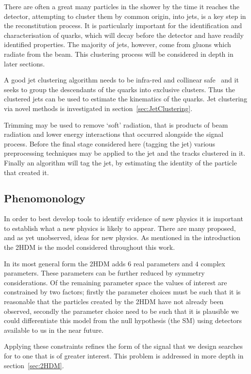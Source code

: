 There are often a great many particles in the shower by the time it reaches the detector,
attempting to cluster them by common origin,
into jets, is a key step in the reconstitution process.
It is particularly important for the identification and characterisation of quarks,
which will decay before the detector and have readily identified properties.
The majority of jets, however, come from gluons which radiate from the beam.
This clustering process will be considered in depth in later sections.

A good jet clustering algorithm needs to be infra-red and collinear safe~\cite[p.~10]{Salam2010TowardsJetography}
and it seeks to group the descendants of the quarks into exclusive clusters.
Thus the clustered jets can be used to estimate the kinematics of the quarks.
Jet clustering via novel methods is investigated in section~\ref{sec:JetClustering}.

Trimming may be used to remove `soft' radiation, that is products of beam radiation and lower energy interactions that occurred alongside the signal process.
Before the final stage considered here (tagging the jet) various preprocessing techniques may be applied to the jet and the tracks clustered in it.
Finally an algorithm will tag the jet, by estimating the identity of the particle that created it.

\subsection{Phenomonology}
In order to best develop tools to identify evidence of new physics it is important to establish what
a new physics is likely to appear.
There are many proposed, and as yet unobserved, ideas for new physics.
As mentioned in the introduction the 2HDM is the model considered throughout this work.

In its most general form the 2HDM adds \(6\) real parameters and \(4\) complex parameters.
These parameters can be further reduced by symmetry considerations.
Of the remaining parameter space the values of interest are constrained by two factors;
firstly the parameter choices must be such that it is reasonable that the particles created by the 2HDM
have not already been observed,
secondly the parameter choice need to be such that it is plausible we could differentiate
this model from the null hypothesis (the SM) using detectors available to us in the near future.

Applying these constraints refines the form of the signal that we design searches for to
one that is of greater interest.
This problem is addressed in more depth in section~\ref{sec:2HDM}.

